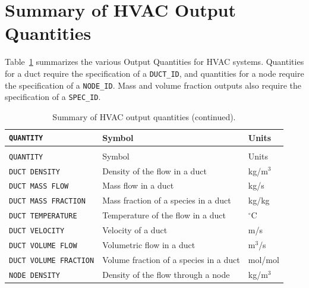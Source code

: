 \documentclass[11pt]{book}
\newcommand{\ct}{\tt\small}
\begin{document}
\clearpage
\section{Summary of HVAC Output Quantities}
\label{info:hvacoutputquantities}

Table~\ref{tab:hvacoutput} summarizes the various Output Quantities for HVAC systems.  Quantities for a duct require the specification
of a {\ct DUCT\_ID}, and quantities for a node require the specification of a {\ct NODE\_ID}.  Mass and volume fraction outputs also require the specification of a {\ct SPEC\_ID}.

\setlength\LTleft{0pt}
\setlength\LTright{0pt}
\begin{longtable}{|l|l|l|@{\extracolsep{\fill}}}
\caption[Output quantities.]{Summary of HVAC output quantities.}
\label{tab:hvacoutput} \\
\hline
{\ct QUANTITY}                                  & Symbol                                    & Units           \\
\hline \hline
\endfirsthead
\caption[]{Summary of HVAC output quantities (continued).} \\
\hline
{\ct QUANTITY}                                  & Symbol                                    & Units           \\
\hline \hline
\endhead
{\ct DUCT DENSITY}                              & Density of the flow in a duct             &  kg/m$^3$             \\ \hline
{\ct DUCT MASS FLOW}                            & Mass flow in a duct                       &  kg/s                 \\ \hline
{\ct DUCT MASS FRACTION}                        & Mass fraction of a species in a duct      &  kg/kg                \\ \hline
{\ct DUCT TEMPERATURE}                          & Temperature of the flow in a duct         & $^\circ$C             \\ \hline
{\ct DUCT VELOCITY}                             & Velocity of a duct                        &  m/s                  \\ \hline
{\ct DUCT VOLUME FLOW}                          & Volumetric flow in a duct                 &  m$^3$/s              \\ \hline
{\ct DUCT VOLUME FRACTION}                      & Volume fraction of a species in a duct    &  mol/mol              \\ \hline
{\ct NODE DENSITY}                              & Density of the flow through a node        &  kg/m$^3$             \\ \hline

\end{longtable}
\end{document}
